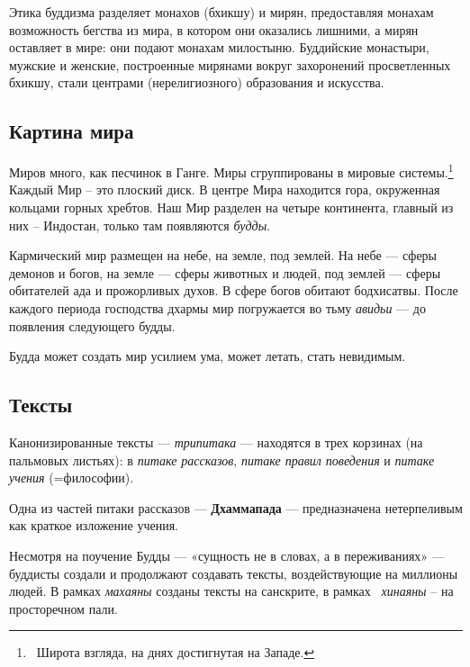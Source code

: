 \documentclass[a4paper]{article}
\begin{document}
{
Этика буддизма разделяет монахов (бхикшу) и мирян, предоставляя монахам возможность бегства из мира, в котором они
оказались лишними, а мирян оставляет в мире: они подают монахам милостыню. Буддийские монастыри, мужские и женские,
построенные мирянами вокруг захоронений просветленных бхикшу, стали центрами (нерелигиозного) образования и искусства.}

\subsection[Картина мира]{ Картина мира}
{
Миров много, как песчинок в Ганге. Миры сгруппированы в мировые системы.\footnote{\foreignlanguage{russian}{\ Широта
взгляда, на днях достигнутая на Западе.}} Каждый Мир – это плоский диск. В центре Мира находится гора, окруженная
кольцами горных хребтов. Наш Мир разделен на четыре континента, главный из них – Индостан, только там появляются
\textit{будды}.}

{
Кармический мир размещен на небе, на земле, под землей. На небе — сферы демонов и богов, на земле — сферы животных и
людей, под землей — сферы обитателей ада и прожорливых духов. В сфере богов обитают бодхисатвы. После каждого периода
господства дхармы мир погружается во тьму \textit{авидьи} — до появления следующего будды.}

{
Будда может создать мир усилием ума, может летать, стать невидимым. }

\subsection[Тексты]{ Тексты}
{
Канонизированные тексты — \textit{трипитака} — находятся в трех корзинах (на пальмовых листьях): в \textit{питаке
рассказов}, \textit{питаке правил поведения} и \textit{питаке учения} (=философии).}

{
Одна из частей питаки рассказов — \textbf{Дхаммапада} — предназначена нетерпеливым как краткое изложение учения.}

{
Несмотря на поучение Будды — «сущность не в словах, а в переживаниях» — буддисты создали и продолжают создавать тексты,
воздействующие на миллионы людей. В рамках \textit{махаяны} созданы тексты на санскрите, в рамках \ \textit{хинаяны} –
на просторечном пали.}
\end{document}
